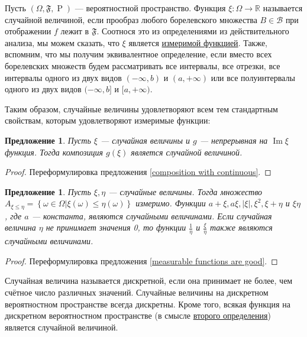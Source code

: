 \documentclass[12pt]{article}
\newtheorem{proposition}[theorem]{Предложение}
\numberwithin{theorem}{section}
\theoremstyle{definition}
\newcommand{\defin}[2]{\hypertarget{#2}{{\color{red} #1}}}
\newcommand{\RR}{\mathbb{R}}
\newcommand{\calB}{\mathcal{B}}
\newcommand{\prob}{\operatorname{P}}
\newcommand{\events}{\mathfrak{F}}
\newcommand{\Image}{\operatorname{Im}}
\newcommand{\defineset}[2]{\left\{
	\left.
	#1
	\right\vert
	#2
	\right\}}
\begin{document}
	Пусть $ (\Omega, \events, \prob) $ --- вероятностной пространство.
	Функция $ \xi \colon \Omega \to \RR $ называется \defin{случайной величиной}{random-variable},
	если прообраз любого борелевского множества $ B \in \calB $ при отображении $ f $
	лежит в $ \events $. Соотнося это из определениями из действительного анализа, 
	мы можем сказать, что $ \xi $ является \hyperlink{measurable-function}{измеримой функцией}.
	Также, вспомним, что мы получим эквивалентное определение,
	если вместо всех борелевских множеств будем рассматривать все интервалы, все отрезки,
	все интервалы одного из двух видов $ (-\infty, b) $ и $ (a, +\infty) $
	или все полуинтервалы одного из двух видов $ (-\infty, b] $ и $ [a, +\infty) $.
	
	Таким образом, случайные величины удовлетворяют всем тем стандартным свойствам, 
	которым удовлетворяют измеримые функции:
	
	\begin{proposition} \label{random variebles composition with continuous}
		Пусть $ \xi $ --- случайная величины и $ g $ --- непрерывная на $ \Image \xi $ функция.
		Тогда композиция $ g(\xi) $ является случайной величиной.
	\end{proposition}
	
	\begin{proof}
		Переформулировка предложения \ref{composition with continuous}.
	\end{proof}
	
	\begin{proposition} \label{random variables are good}
		Пусть $ \xi, \eta $ --- случайные величины.
		Тогда множество $ A_{\xi \leqslant \eta} = \defineset{\omega \in \Omega}{\xi(\omega) \leqslant \eta(\omega)} $
		измеримо.
		Функции $ a + \xi, a\xi, |\xi|, \xi^2, \xi + \eta $ и $ \xi\eta $, где $ a $ --- константа, являются случайными величинами.
		Если случайная величина $ \eta $ не принимает значения 0, то функции $ \tfrac{1}{\eta} $ и $ \tfrac{\xi}{\eta} $
		также являются случайными величинами.
	\end{proposition}
	
	\begin{proof}
		Переформулировка предложения \ref{measurable functions are good}.
	\end{proof}
	
	Случайная величина называется \defin{дискретной}{discrete-random-variable}, 
	если она принимает не более, чем счётное число различных значений.
	Случайные величины на дискретном вероятностном пространстве всегда дискретны.
	Кроме того, всякая функция на дискретном вероятностном пространстве (в смысле \hyperlink{discr-2}{второго определения})
	является случайной величиной.
	
\end{document}

